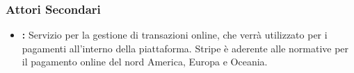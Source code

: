\subsubsection{Attori Secondari}
\begin{itemize}
\item \textbf{:} Servizio per la gestione di transazioni online, che verrà utilizzato per i pagamenti all'interno della piattaforma. Stripe è aderente alle normative per il pagamento online del nord America, Europa e Oceania.
\end{itemize}

